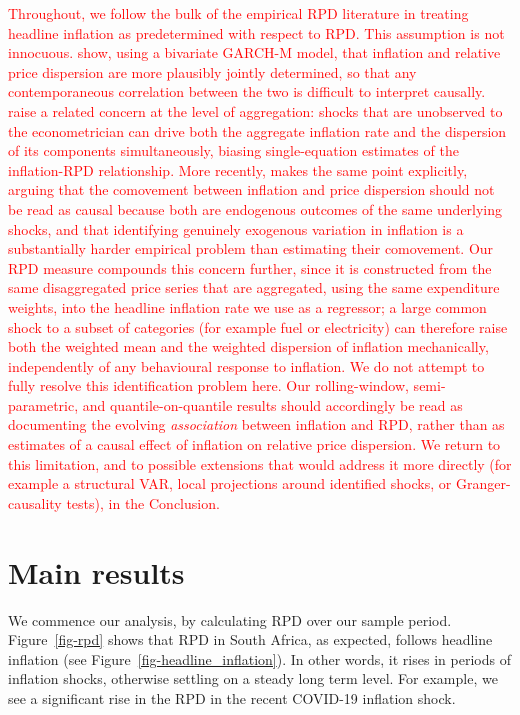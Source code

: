 \documentclass[
  letterpaper,
  DIV=11,
  numbers=noendperiod]{scrartcl}
\begin{document}
{\textcolor{red}{Throughout, we follow the bulk of the empirical RPD
literature in treating headline inflation as predetermined with respect
to RPD. This assumption is not innocuous. \citet{grier1996} show, using
a bivariate GARCH-M model, that inflation and relative price dispersion
are more plausibly jointly determined, so that any contemporaneous
correlation between the two is difficult to interpret causally.
\citet{parsley1996} raise a related concern at the level of aggregation:
shocks that are unobserved to the econometrician can drive both the
aggregate inflation rate and the dispersion of its components
simultaneously, biasing single-equation estimates of the inflation-RPD
relationship. More recently, \citet{sheremirov2020} makes the same point
explicitly, arguing that the comovement between inflation and price
dispersion should not be read as causal because both are endogenous
outcomes of the same underlying shocks, and that identifying genuinely
exogenous variation in inflation is a substantially harder empirical
problem than estimating their comovement. Our RPD measure compounds this
concern further, since it is constructed from the same disaggregated
price series that are aggregated, using the same expenditure weights,
into the headline inflation rate we use as a regressor; a large common
shock to a subset of categories (for example fuel or electricity) can
therefore raise both the weighted mean and the weighted dispersion of
inflation mechanically, independently of any behavioural response to
inflation. We do not attempt to fully resolve this identification
problem here. Our rolling-window, semi-parametric, and
quantile-on-quantile results should accordingly be read as documenting
the evolving \emph{association} between inflation and RPD, rather than
as estimates of a causal effect of inflation on relative price
dispersion. We return to this limitation, and to possible extensions
that would address it more directly (for example a structural VAR, local
projections around identified shocks, or Granger-causality tests), in
the Conclusion.}}

\section{Main results}\label{main-results}

We commence our analysis, by calculating RPD over our sample period.
Figure~\ref{fig-rpd} shows that RPD in South Africa, as expected,
follows headline inflation (see Figure~\ref{fig-headline_inflation}). In
other words, it rises in periods of inflation shocks, otherwise settling
on a steady long term level. For example, we see a significant rise in
the RPD in the recent COVID-19 inflation shock.
\end{document}

